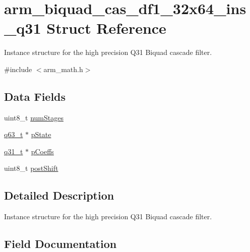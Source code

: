 \hypertarget{structarm__biquad__cas__df1__32x64__ins__q31}{}\section{arm\+\_\+biquad\+\_\+cas\+\_\+df1\+\_\+32x64\+\_\+ins\+\_\+q31 Struct Reference}
\label{structarm__biquad__cas__df1__32x64__ins__q31}


Instance structure for the high precision Q31 Biquad cascade filter.  




{\ttfamily \#include $<$arm\+\_\+math.\+h$>$}

\subsection*{Data Fields}
\begin{DoxyCompactItemize}
\item 
uint8\+\_\+t \mbox{\hyperlink{structarm__biquad__cas__df1__32x64__ins__q31_a3615af038f56917909e0370c11bc2ec7}{num\+Stages}}
\item 
\mbox{\hyperlink{arm__math_8h_a5aea1cb12fc02d9d44c8abf217eaa5c6}{q63\+\_\+t}} $\ast$ \mbox{\hyperlink{structarm__biquad__cas__df1__32x64__ins__q31_adefeb77301cc04e4d7d22f323029d588}{p\+State}}
\item 
\mbox{\hyperlink{arm__math_8h_adc89a3547f5324b7b3b95adec3806bc0}{q31\+\_\+t}} $\ast$ \mbox{\hyperlink{structarm__biquad__cas__df1__32x64__ins__q31_a68888e36167d81cb7836db10367a1682}{p\+Coeffs}}
\item 
uint8\+\_\+t \mbox{\hyperlink{structarm__biquad__cas__df1__32x64__ins__q31_a74050e9f36542bd56f4052381a82ae8f}{post\+Shift}}
\end{DoxyCompactItemize}


\subsection{Detailed Description}
Instance structure for the high precision Q31 Biquad cascade filter. 

\subsection{Field Documentation}
\mbox{\label{structarm__biquad__cas__df1__32x64__ins__q31_a3615af038f56917909e0370c11bc2ec7}} 
